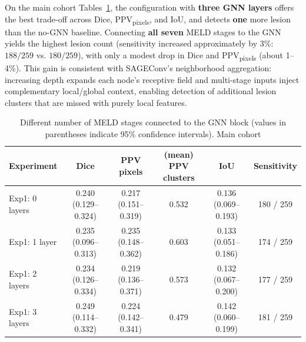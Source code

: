 \documentclass[a4paper,12pt]{article}
\begin{document}
On the main cohort Tables~\ref{tab:gnn_main}, the configuration with \textbf{three GNN layers} offers the best trade-off across Dice, PPV\textsubscript{pixels}, and IoU, and detects \textbf{one} more lesion than the no-GNN baseline. 
Connecting \textbf{all seven} MELD stages to the GNN yields the highest lesion count (sensitivity increased approximately by 3\%: \(188/259\) vs. \(180/259\)), with only a modest drop in Dice and PPV\textsubscript{pixels} (about 1–4\%). 
This gain is consistent with SAGEConv’s neighborhood aggregation: increasing depth expands each node’s receptive field and multi-stage inputs inject complementary local/global context, enabling detection of additional lesion clusters that are missed with purely local features.
\begin{table}[ht]
\centering
\footnotesize
\caption{Different number of MELD stages connected to the GNN block (values in parentheses indicate 95\% confidence intervals). Main cohort}
\label{tab:gnn_main}
\begin{tabular}{lccccc}
\textbf{Experiment} & \textbf{Dice} & \makecell{\textbf{PPV}\\\textbf{pixels}} &
\makecell{\textbf{(mean) PPV}\\\textbf{clusters}} & \textbf{IoU} & \textbf{Sensitivity} \\
\hline
Exp1: 0 layers  & \makecell{\colorbox{blue!20}{0.240} \\ (0.129--0.324)} & \makecell{0.217 \\ (0.151--0.319)} & 0.532 & \makecell{\colorbox{blue!20}{0.136} \\ (0.069--0.193)} & \colorbox{orange!20}{180 / 259} \\
Exp1: 1 layer   & \makecell{\colorbox{orange!20}{0.235} \\ (0.096--0.313)} & \makecell{\colorbox{green!20}{0.235} \\ (0.148--0.362)} & \colorbox{green!20}{0.603} & \makecell{\colorbox{orange!20}{0.133} \\ (0.051--0.186)} & 174 / 259 \\
Exp1: 2 layers  & \makecell{0.234 \\ (0.126--0.334)} & \makecell{\colorbox{orange!20}{0.219} \\ (0.136--0.371)} & \colorbox{blue!20}{0.573} & \makecell{0.132 \\ (0.067--0.200)} & 177 / 259 \\
Exp1: 3 layers  & \makecell{\colorbox{green!20}{0.249} \\ (0.114--0.332)} & \makecell{\colorbox{blue!20}{0.224} \\ (0.142--0.341)} & 0.479 & \makecell{\colorbox{green!20}{0.142} \\ (0.060--0.199)} & \colorbox{blue!20}{181 / 259} \\

\end{tabular}
\end{table}
\end{document}
